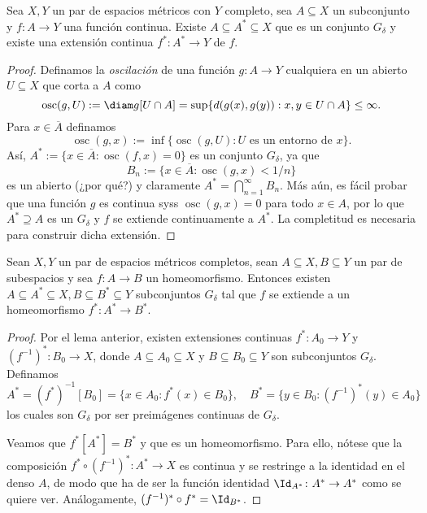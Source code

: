 \documentclass[topologia-analisis.tex]{subfiles}
\begin{document}
\begin{lem}
	Sea $X, Y$ un par de espacios métricos con $Y$ completo, sea $A \subseteq X$ un subconjunto y $f \colon A \to Y$ una función continua.
	Existe $A \subseteq A^* \subseteq X$ que es un conjunto $G_\delta$ y existe una extensión continua $f^* \colon A^* \to Y$ de $f$.
\end{lem}
\begin{proof}
	Definamos la \emph{oscilación} de una función $g \colon A \to Y$ cualquiera en un abierto $U \subseteq X$ que corta a $A$ como
	\[
		\operatorname{osc}(g, U) := \diam g[U\cap A] = \sup\{ d(g(x), g(y)) : x, y \in U \cap A \} \le \infty.
	\]
	Para $x \in \overline{A}$ definamos
	\[
		\operatorname{osc}(g, x) := \inf\{ \operatorname{osc}(g, U) : U \text{ es un entorno de } x \}.
	\]
	Así, $A^* := \{ x \in \overline{A} : \operatorname{osc}(f, x) = 0 \}$ es un conjunto $G_\delta$, ya que
	\[
		B_n := \{ x \in \overline{A} : \operatorname{osc}(g, x) < 1/n \}
	\]
	es un abierto (¿por qué?) y claramente $A^* = \bigcap_{n=1}^\infty B_n$.
	Más aún, es fácil probar que una función $g$ es continua syss $\operatorname{osc}(g, x) = 0$ para todo $x \in A$,
	por lo que $A^* \supseteq A$ es un $G_\delta$ y $f$ se extiende continuamente a $A^*$.
	La completitud es necesaria para construir dicha extensión.
\end{proof}
\begin{thm}[Lavrentieff]
	Sean $X, Y$ un par de espacios métricos completos, sean $A \subseteq X, B \subseteq Y$ un par de subespacios y sea $f \colon A \to B$ un homeomorfismo.
	Entonces existen $A \subseteq A^* \subseteq X, B \subseteq B^* \subseteq Y$ subconjuntos $G_\delta$ tal que $f$ se extiende
	a un homeomorfismo $f^* \colon A^* \to B^*$.
\end{thm}
\begin{proof}
	Por el lema anterior, existen extensiones continuas $f^* \colon A_0 \to Y$ y $(f^{-1})^* \colon B_0 \to X$,
	donde $A \subseteq A_0 \subseteq X$ y $B \subseteq B_0 \subseteq Y$ son subconjuntos $G_\delta$.
	Definamos
	\[
		A^* = (f^*)^{-1}[B_0] = \{ x \in A_0 : f^*(x) \in B_0 \},
		\quad B^* = \{ y \in B_0 : (f^{-1})^*(y) \in A_0 \}
	\]
	los cuales son $G_\delta$ por ser preimágenes continuas de $G_\delta$.

	Veamos que $f^*[A^*] = B^*$ y que es un homeomorfismo.
	Para ello, nótese que la composición $f^* \circ (f^{-1})^* \colon A^* \to X$ es continua y se restringe a la identidad en el denso $A$,
	de modo que ha de ser la función identidad $\Id_{A^*} \colon A^* \to A^*$ como se quiere ver.
	Análogamente, $(f^{-1})^* \circ f^* = \Id_{B^*}$.
\end{proof}
\end{document}
